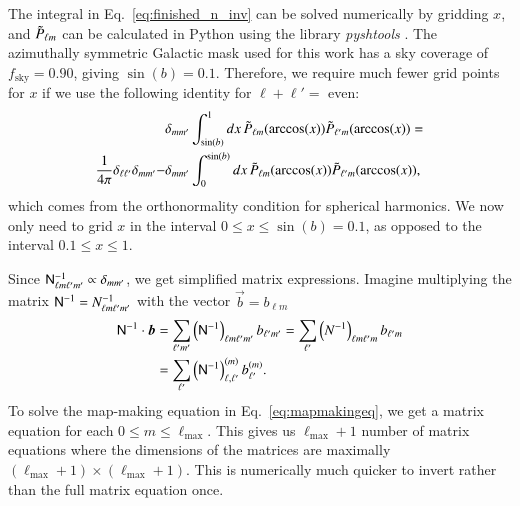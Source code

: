 \documentclass[twocolumn]{../common/aa}
\newcommand{\N}[0]{\tens{N}}
\begin{document}
The integral in Eq.~\eqref{eq:finished_n_inv} can be solved numerically by gridding $x$, and $\Tilde{P}_{\ell m}$ can be calculated in Python using the library \textit{pyshtools} \citep{https://doi.org/10.1029/2018GC007529}. The azimuthally symmetric Galactic mask used for this work has a sky coverage of $f_{\mathrm{sky}} = 0.90$, giving $\sin(b) = 0.1$. Therefore, we require much fewer grid points for $x$ if we use the following identity for $\ell+\ell' = $ even:
\begin{align}
&\delta_{mm'} \int_{\sin(b)}^{1} dx \, \Tilde{P}_{\ell m}(\arccos(x)) \Tilde{P}_{\ell' m}(\arccos(x)) = \\
\frac{1}{4\pi}\delta_{\ell \ell'}\delta_{m m'} - &\delta_{mm'} \int_{0}^{\sin(b)} dx \, \Tilde{P}_{\ell m}(\arccos(x)) \Tilde{P}_{\ell' m}(\arccos(x)),
\end{align}
which comes from the orthonormality condition for spherical harmonics. We now only need to grid $x$ in the interval $0\leq x \leq \sin(b) = 0.1$, as opposed to the interval $0.1 \leq x \leq 1$.

Since $\N^{-1}_{\ell m \ell' m'} \propto \delta_{m m'}$, we get simplified matrix expressions. Imagine multiplying the matrix $\N^{-1} = N^{-1}_{\ell m \ell' m'}$ with the vector $\vec{b} = b_{\ell m}$
\begin{align}
\N^{-1} \cdot \vec{b} &= \sum_{\ell' m'}\left(\N^{-1}\right)_{\ell m \ell' m'}b_{\ell' m'} = \sum_{\ell'}\left(N^{-1}\right)_{\ell m \ell' m}b_{\ell' m}\\
&= \sum_{\ell' }\left(\N^{-1}\right)^{(m)}_{\ell, \ell'}b^{(m)}_{\ell'}.
\end{align}
To solve the map-making equation in Eq.~\eqref{eq:mapmakingeq}, we get a matrix equation for each $0 \leq m \leq \ell_{\mathrm{max}}$. This gives us $\ell_{\textrm{max}}+1$ number of matrix equations where the dimensions of the matrices are maximally $(\ell_{\textrm{max}}+1) \times (\ell_{\textrm{max}}+1)$. This is numerically much quicker to invert rather than the full matrix equation once.
\end{document}
